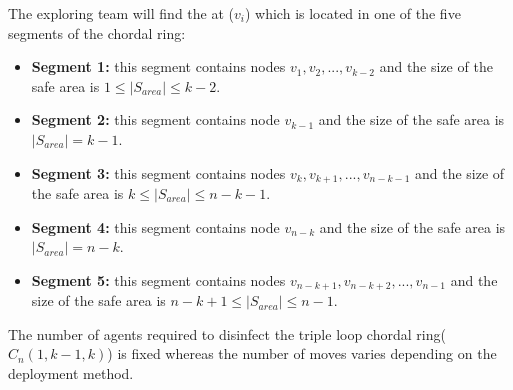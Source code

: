   




The exploring team will find the \bv at ($v_i$) which is located in one of the five segments of the chordal ring:
\begin{itemize}

\item {\bf Segment 1:}  this segment contains nodes $v_1,v_2,...,v_{k-2}$ and the size of the safe area is $1\leq |S_{area}| \leq k-2$.
\item {\bf Segment 2:}  this segment contains node $v_{k-1}$  and the size of the safe area is $|S_{area}| =k-1$.
\item {\bf Segment 3:}  this segment contains nodes $v_{k},v_{k+1},...,v_{n-k-1}$ and the size of the safe area is $k\leq |S_{area}| \leq n-k-1$.
\item {\bf Segment 4:}  this segment contains node $v_{n-k}$  and the size of the safe area is $|S_{area}| =n-k$.
\item {\bf Segment 5:}  this segment contains nodes $v_{n-k+1},v_{n-k+2},...,v_{n-1}$ and the size of the safe area is $n-k+1\leq |S_{area}| \leq n-1$.
\end{itemize}





The number of agents required to disinfect the triple loop chordal ring($C_n(1,k-1,k)$) is fixed whereas the number of moves varies depending on the deployment method.


